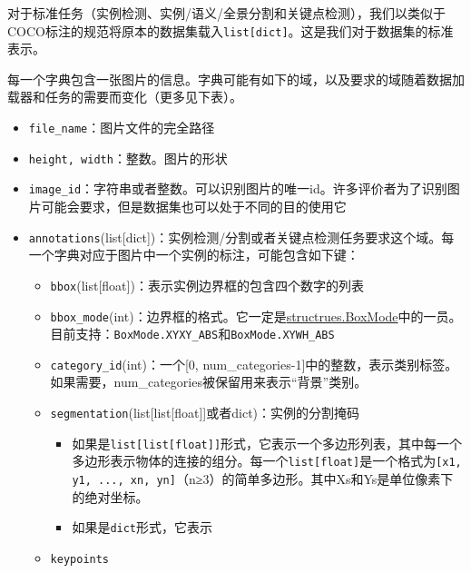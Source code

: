 \documentclass[../main.tex]{subfile}
\begin{document}
对于标准任务（实例检测、实例/语义/全景分割和关键点检测），我们以类似于COCO标注的规范将原本的数据集载入\lstinline{list[dict]}。这是我们对于数据集的标准表示。

每一个字典包含一张图片的信息。字典可能有如下的域，以及要求的域随着数据加载器和任务的需要而变化（更多见下表）。



\begin{itemize}
    \item \lstinline{file_name}：图片文件的完全路径
    \item \lstinline{height, width}：整数。图片的形状
    \item \lstinline{image_id}：字符串或者整数。可以识别图片的唯一id。许多评价者为了识别图片可能会要求，但是数据集也可以处于不同的目的使用它
    \item \lstinline{annotations}(list[dict])：实例检测/分割或者关键点检测任务要求这个域。每一个字典对应于图片中一个实例的标注，可能包含如下键：
          \begin{itemize}
              \item \lstinline{bbox}(list[float])：表示实例边界框的包含四个数字的列表
              \item \lstinline{bbox_mode}(int)：边界框的格式。它一定是\href{https://detectron2.readthedocs.io/en/latest/modules/structures.html#detectron2.structures.BoxMode}{structrues.BoxMode}中的一员。目前支持：\lstinline{BoxMode.XYXY_ABS}和\lstinline{BoxMode.XYWH_ABS}
              \item \lstinline{category_id}(int)：一个[0, num\_categories-1]中的整数，表示类别标签。如果需要，num\_categories被保留用来表示“背景”类别。
              \item \lstinline{segmentation}(list[list[float]]或者dict)：实例的分割掩码
                    \begin{itemize}
                        \item 如果是\lstinline{list[list[float]]}形式，它表示一个多边形列表，其中每一个多边形表示物体的连接的组分。每一个\lstinline{list[float]}是一个格式为\lstinline{[x1, y1, ..., xn, yn]}（n≥3）的简单多边形。其中Xs和Ys是单位像素下的绝对坐标。
                        \item 如果是\lstinline{dict}形式，它表示
                    \end{itemize}
              \item \lstinline{keypoints}

\end{itemize}
\end{itemize}
\end{document}
